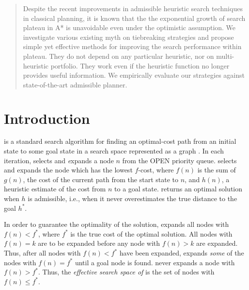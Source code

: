 

\begin{abstract}
Despite the recent improvements in admissible heuristic search techniques
in classical planning, it is known that the the exponential growth of
search plateau in A* is unavoidable even under the optimistic assumption.
We investigate various existing myth on tiebreaking
strategies and propose simple yet effective methods for improving the
search performance within plateau.
 They do not depend on any particular heuristic, nor
 on multi-heuristic portfolio.
 They work even if the heuristic
 function no longer provides useful information.
 We empirically evaluate our strategies against state-of-the-art admissible planner.
\end{abstract}

\section{Introduction}
\label{sec-1}




\astar is a standard search algorithm for finding an optimal-cost path 
from an initial state to some goal state in a search space represented as a graph \cite{hart1968formal}.
In each iteration, \astar selects and {\emph expands} a node $n$ from the OPEN priority queue.
\astar selects and expands the node which has the lowest $f$-cost, where $f(n)$ is the sum of  $g(n)$, the cost of the current path from the start state to $n$, and $h(n)$, a heuristic estimate of the cost from $n$ to a goal state.
\astar returns an optimal solution when $h$ is admissible, i.e., when it
never overestimates the true distance to the goal $h^*$.

In order to guarantee the optimality of the solution, \astar expands all
nodes with $f(n) < f^*$, where $f^*$ is the true cost of the optimal solution.
All nodes with $f(n) = k$ are to be expanded before any node with $f(n) > k$ are expanded.
Thus, after all nodes with $f(n) < f^*$ have been expanded, \astar expands \emph{some} of the nodes with $f(n) = f^*$ until a goal node is found.
\astar never expands a node with $f(n) > f^*$.
Thus, the \emph{effective search space of \astar} is the set of nodes with 
$f(n) \leq f^*$.

